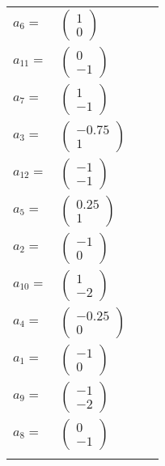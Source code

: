 \documentclass[1p]{elsarticle_modified}
\theoremstyle{definition}
\begin{document}
\begin{tabular}{m{7pt} m{180pt} m{7pt} m{180pt} }
\flushright $a_{6}=$&$\begin{pmatrix}1\\0\end{pmatrix}$ \\
\flushright $a_{11}=$&$\begin{pmatrix}0\\-1\end{pmatrix}$ \\
\flushright $a_{7}=$&$\begin{pmatrix}1\\-1\end{pmatrix}$ \\
\flushright $a_{3}=$&$\begin{pmatrix}-0.75\\1\end{pmatrix}$ \\
\flushright $a_{12}=$&$\begin{pmatrix}-1\\-1\end{pmatrix}$ \\
\flushright $a_{5}=$&$\begin{pmatrix}0.25\\1\end{pmatrix}$ \\
\flushright $a_{2}=$&$\begin{pmatrix}-1\\0\end{pmatrix}$ \\
\flushright $a_{10}=$&$\begin{pmatrix}1\\-2\end{pmatrix}$ \\
\flushright $a_{4}=$&$\begin{pmatrix}-0.25\\0\end{pmatrix}$ \\
\flushright $a_{1}=$&$\begin{pmatrix}-1\\0\end{pmatrix}$ \\
\flushright $a_{9}=$&$\begin{pmatrix}-1\\-2\end{pmatrix}$ \\
\flushright $a_{8}=$&$\begin{pmatrix}0\\-1\end{pmatrix}$\\&\end{tabular}
\end{document}
